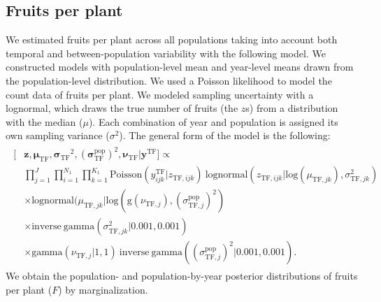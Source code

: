 \documentclass[12pt, oneside, titlepage]{article}   	%
\begin{document}
\subsection{Fruits per plant}


We estimated fruits per plant across all populations taking into account both temporal and between-population variability with the following model. We constructed models with population-level mean and year-level means drawn from the population-level distribution. We used a Poisson likelihood to model the count data of fruits per plant. We modeled sampling uncertainty with a lognormal, which draws the true number of fruits (the $z$s) from a distribution with the median ($\mu$). Each combination of year and population is assigned its own sampling variance ($\sigma^2$). The general form of the model is the following: 
%
\begin{align}
  \begin{split}
  [ &  \bm{z} ,  \bm{\mu_{\mathrm{TF}}} ,  \bm{\sigma_{\mathrm{TF}}}^2 , ( \bm{\sigma^\mathrm{pop}_{\mathrm{TF}}})^2, \bm{\nu_{\mathrm{TF}}}  |  \bm{y^{\mathrm{TF}}} ]  \propto  \\  
 	     & \prod_{j=1}^{J} \prod_{i=1}^{N_1}  \prod_{k=1}^{K_1}  \mathrm{Poisson} ( y^\mathrm{TF}_{ijk} | z_{\mathrm{TF},ijk} )\ \mathrm{lognormal} ( z_{\mathrm{TF},ijk} | \mathrm{log}(\mu_{\mathrm{TF},jk}), \sigma^2_{\mathrm{TF},jk} )  \\
	     & \times \mathrm{lognormal} ( \mu_{\mathrm{TF},jk} | \mathrm{log}(\mathrm{g}(\nu_{\mathrm{TF},j}), (\sigma^\mathrm{pop}_{\mathrm{TF},j} )^2)  \\
	     & \times \mathrm{inverse\ gamma} ( \sigma^2_{\mathrm{TF},jk}  | 0.001, 0.001 ) \\
	     & \times \mathrm{gamma} (\nu_{\mathrm{TF},j} | 1 , 1)\  \mathrm{inverse\ gamma} ( (\sigma^\mathrm{pop}_{\mathrm{TF},j} )^2 | 0.001, 0.001 ) .
  \end{split}
\end{align}
%
We obtain the population- and population-by-year posterior distributions of fruits per plant ($F$) by marginalization. 
\end{document}
